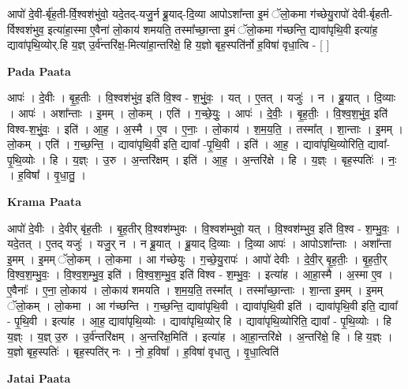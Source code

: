 \documentclass[17pt]{extarticle}
\begin{document}
आपो॑ दे॒वी-र्बृ॑ह॒ती-र्वि॒श्वश॑भुंवो॒ यदे॒तद्-यजु॒र्न ब्रू॒याद्-दि॒व्या आपोऽशा᳚न्ता इ॒मं ॅलो॒कमा ग॑च्छेयु॒रापो॑ देवी-र्बृहती-र्विश्वशंभुव॒ इत्या॑हा॒स्मा ए॒वैना॑ लो॒काय॑ शमयति॒ तस्मा᳚च्छा॒न्ता इ॒मं ॅलो॒कमा ग॑च्छन्ति॒ द्यावा॑पृथि॒वी इत्या॑ह॒ द्यावा॑पृथि॒व्योर्.हि य॒ज्ञ् उ॒र्व॑न्तरि॑क्ष॒-मित्या॑हा॒न्तरि॑क्षे॒ हि य॒ज्ञो बृह॒स्पति॑र्नो ह॒विषा॑ वृधा॒त्वि - [  ] \newline

\textbf{Pada Paata} \newline

आपः॑ । दे॒वीः । बृ॒ह॒तीः । वि॒श्वश॑भुंव॒ इति॑ वि॒श्व - श॒भुं॒वः॒ । यत् । ए॒तत् । यजुः॑ । न । ब्रू॒यात् । दि॒व्याः । आपः॑ । अशा᳚न्ताः । इ॒मम् । लो॒कम् । एति॑ । ग॒च्छे॒युः॒ । आपः॑ । दे॒वीः॒ । बृ॒ह॒तीः॒ । वि॒श्व॒श॒भुं॒व॒ इति॑ विश्व-श॒भुं॒वः॒ । इति॑ । आ॒ह॒ । अ॒स्मै । ए॒व । ए॒नाः॒ । लो॒काय॑ । श॒म॒य॒ति॒ । तस्मा᳚त् । शा॒न्ताः । इ॒मम् । लो॒कम् । एति॑ । ग॒च्छ॒न्ति॒ । द्यावा॑पृथि॒वी इति॒ द्यावा᳚ -पृ॒थि॒वी । इति॑ । आ॒ह॒ । द्यावा॑पृथि॒व्योरिति॒ द्यावा᳚-पृ॒थि॒व्योः । हि । य॒ज्ञ्ः । उ॒रु । अ॒न्तरि॑क्षम् । इति॑ । आ॒ह॒ । अ॒न्तरि॑क्षे । हि । य॒ज्ञ्ः । बृह॒स्पतिः॑ । नः॒ । ह॒विषा᳚ । वृ॒धा॒तु॒ ।  \newline


\textbf{Krama Paata} \newline

आपो॑ दे॒वीः । दे॒वीर् बृ॑ह॒तीः । बृ॒ह॒तीर् वि॒श्वश॑म्भुवः । वि॒श्वश॑म्भुवो॒ यत् । वि॒श्वश॑म्भुव॒ इति॑ वि॒श्व - श॒म्भु॒वः॒ । यदे॒तत् । ए॒तद् यजुः॑ । यजु॒र् न । न ब्रू॒यात् । ब्रू॒याद् दि॒व्याः । दि॒व्या आपः॑ । आपोऽशा᳚न्ताः । अशा᳚न्ता इ॒मम् । इ॒मम् ॅलो॒कम् । लो॒कमा । आ ग॑च्छेयुः । ग॒च्छे॒यु॒रापः॑ । आपो॑ देवीः । दे॒वी॒र् बृ॒ह॒तीः॒ । बृ॒ह॒ती॒र् वि॒श्व॒श॒म्भु॒वः॒ । वि॒श्व॒श॒म्भु॒व॒ इति॑ । वि॒श्व॒श॒म्भु॒व॒ इति॑ विश्व - श॒म्भु॒वः॒ । इत्या॑ह । आ॒हा॒स्मै । अ॒स्मा ए॒व । ए॒वैनाः᳚ । ए॒ना॒ लो॒काय॑ । लो॒काय॑ शमयति । श॒म॒य॒ति॒ तस्मा᳚त् । तस्मा᳚च्छा॒न्ताः । शा॒न्ता इ॒मम् । इ॒मम् ॅलो॒कम् । लो॒कमा । आ ग॑च्छन्ति । ग॒च्छ॒न्ति॒ द्यावा॑पृथि॒वी । द्यावा॑पृथि॒वी इति॑ । द्यावा॑पृथि॒वी इति॒ द्यावा᳚ - पृ॒थि॒वी । इत्या॑ह । आ॒ह॒ द्यावा॑पृथि॒व्योः । द्यावा॑पृथि॒व्योर् हि । द्यावा॑पृथि॒व्योरिति॒ द्यावा᳚ - पृ॒थि॒व्योः । हि य॒ज्ञ्ः । य॒ज्ञ् उ॒रु । उ॒र्व॑न्तरि॑क्षम् । अ॒न्तरि॑क्ष॒मिति॑ । इत्या॑ह । आ॒हा॒न्तरि॑क्षे । अ॒न्तरि॑क्षे॒ हि । हि य॒ज्ञ्ः । य॒ज्ञो बृह॒स्पतिः॑ । बृह॒स्पति॑र् नः । नो॒ ह॒विषा᳚ । ह॒विषा॑ वृधातु । वृ॒धा॒त्विति॑ \newline

\textbf{Jatai Paata} \newline
\end{document}
